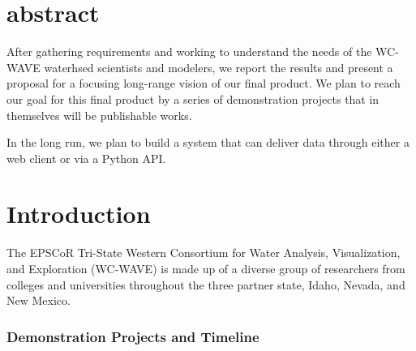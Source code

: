 \documentclass[
11pt, %
a4paper, %
twoside, %
headinclude,footinclude, %
BCOR5mm, %
]{scrartcl}
\title{\normalfont\spacedallcaps{Article Title}} %
\author{\spacedlowsmallcaps{Matthew A. Turner*}} %
\begin{document}
\maketitle %

\setcounter{tocdepth}{2} %

\tableofcontents %
\section*{abstract}

After gathering requirements and working to understand the needs of the 
WC-WAVE waterhsed scientists and modelers, we report the results and present a
proposal for a focusing long-range vision of our final product. We plan to 
reach our goal for this final product by a series of demonstration projects that
in themselves will be publishable works.

In the long run, we plan to build a system that can deliver data through either
a web client or via a Python API. 

{\let\thefootnote\relax{}}



\newpage
     

\section{Introduction} %
\label{sec:intro}

The EPSCoR Tri-State Western Consortium for Water Analysis, Visualization, and Exploration (WC-WAVE)
is made up of a diverse group of researchers from colleges and universities 
throughout the three partner state, Idaho, Nevada, and New Mexico. 



\subsubsection{Demonstration Projects and Timeline} %
\label{ssub:demo_proj_and_timeline}





\end{document}
